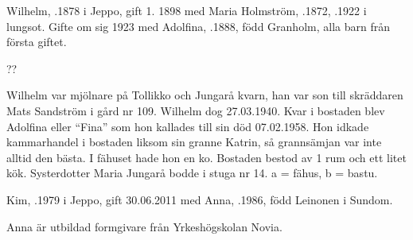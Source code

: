 %
Wilhelm, .1878 i Jeppo, gift 1. 1898 med Maria Holmström, .1872, .1922 i lungsot. Gifte om sig 1923 med Adolfina, .1888, född Granholm, alla barn från första giftet.
\begin{jhchildren}
  \item {}
  \item {}
  \item {}
  \item {}
  \item {} ??
  \item {}
\end{jhchildren}
Wilhelm var mjölnare på Tollikko och Jungarå kvarn, han var son till skräddaren Mats Sandström i gård nr 109. Wilhelm dog 27.03.1940. Kvar i bostaden blev Adolfina eller ``Fina'' som hon kallades till sin död 07.02.1958. Hon idkade kammarhandel i bostaden liksom sin granne Katrin, så grannsämjan var inte  alltid den bästa. I fähuset hade hon en ko. Bostaden bestod av 1 rum och ett litet kök. Systerdotter Maria Jungarå bodde i stuga nr 14. a = fähus, b = bastu.



%



%
Kim, .1979 i Jeppo, gift 30.06.2011 med Anna, .1986, född Leinonen i  Sundom.
\begin{jhchildren}
  \item {}
  \item {}
  \item {}
\end{jhchildren}
Anna är utbildad formgivare från Yrkeshögskolan Novia.

